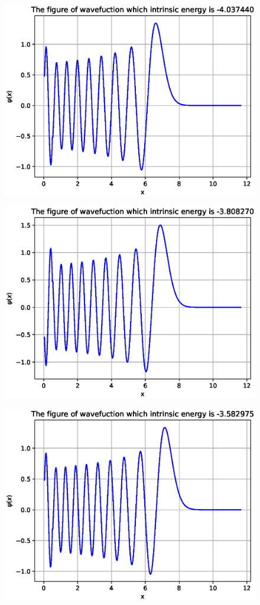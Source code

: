 \documentclass[twoside,twocolumn]{article}
\begin{document}
\begin{CJK*}{UTF8}{gkai}
\begin{figure}
	\label{fig:16}
\end{figure}
\begin{figure}
	\centering
	\includegraphics[width=0.9\linewidth]{figure/17}
	\label{fig:17}
\end{figure}
\begin{figure}
	\centering
	\includegraphics[width=0.9\linewidth]{figure/18}
	\label{fig:18}
\end{figure}
\begin{figure}
	\centering
	\includegraphics[width=0.9\linewidth]{figure/19}

\end{figure}
\end{CJK*}
\end{document}
